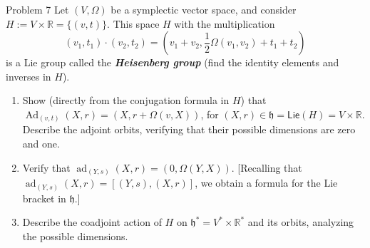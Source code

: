 \begin{idea1}{Problem 7}\leavevmode
	Let $(V,\Omega)$ be a symplectic vector space, and consider $H:=V\times \mathbb{R}=\{(v,t)\}$. This space $H$ with the multiplication
	\[(v_1,t_1)\cdot(v_2,t_2)=\left( v_1+v_2,\frac{1}{2}\Omega(v_1,v_2)+t_1+t_2 \right) \]
	is a Lie group called the \textit{\textbf{Heisenberg group}} (find the identity elements and inverses in  $H$).
	\begin{enumerate}[label=\alph*.]
		\item Show (directly from the conjugation formula in $H$) that $\operatorname{Ad}_{(v,t)}(X,r)=(X,r+\Omega(v,X))$, for $(X,r)\in\mathfrak{h}=\mathsf{Lie}(H) =V\times \mathbb{R}$. Describe the adjoint orbits, verifying that their possible dimensions are zero and one.
		\item Verify that $\operatorname{ad}_{(Y,s)}(X,r)=(0,\Omega(Y,X))$. [Recalling that $\operatorname{ad}_{(Y,s)}(X,r)=[(Y,s),(X,r)]$, we obtain a formula for the Lie bracket in $ \mathfrak{h}$.]
		\item Describe the coadjoint action of $H$ on $\mathfrak{h}^*=V^*\times \mathbb{R}^*$ and its orbits, analyzing the possible dimensions.
	\end{enumerate}
\end{idea1}

